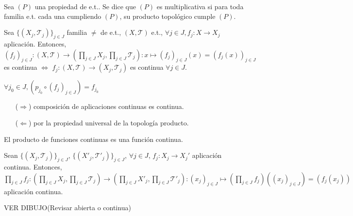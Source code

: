 \begin{defn}
  Sea $(P)$ una propiedad de e.t.. Se dice que $(P)$ es multiplicativa si para toda familia e.t. cada una cumpliendo $(P)$, su producto topológico cumple $(P)$.
\end{defn}

\begin{prop}
  Sea $\{ ( X_{j}, \mathcal{T}_{j} ) \}_{j \in J}$ familia $\neq$ de e.t., $( X, \mathcal{T} )$ e.t., $\forall j \in J, f_{j}: X \to X_{j}$ aplicación. Entonces, $( f_{j} )_{j \in J}: ( X, \mathcal{T} ) \to ( \prod_{j \in J} X_{j}, \prod_{j \in J} \mathcal{T}_{j} ) : x \mapsto ( f_{j} )_{j \in J}(x) = ( f_{j}(x) )_{j \in J}$ es continua $\Leftrightarrow$ $f_{j}: ( X, \mathcal{T} ) \to ( X_{j}, \mathcal{T}_{j} )$  es continua $\forall j \in J$.
\end{prop}

\begin{dem}
  $\forall j_{0} \in J, (p_{j_{0}} \circ ( f_{j} )_{j \in J}) = f_{j_{0}}$
  \begin{enumerate}[label=(\roman*)]
    \item [($\Rightarrow$)]  composición de aplicaciones continuas es continua.
    \item [($\Leftarrow$)] por la propiedad universal de la topología producto.
  \end{enumerate}
\end{dem}

 \begin{obs}
   El producto de funciones continuas es una función continua.
 \end{obs}

\begin{prop}
  Sean $\{ ( X_{j}, \mathcal{T}_{j} ) \}_{j \in J}$, $\{ ( X'_{j}, \mathcal{T'}_{j} ) \}_{j \in J}$, $\forall j \in J$, $f_{j}: X_{j} \to X_{j}'$ aplicación continua. Entonces, $\prod_{j \in J} f_{j}: ( \prod_{j \in J} X_{j}, \prod_{j \in J} \mathcal{T}_{j} ) \to ( \prod_{j \in J} X'_{j}, \prod_{j \in J} \mathcal{T'}_{j} ): ( x_{j} )_{j \in J} \mapsto (\prod_{j \in J} f_{j})(( x_{j} )_{j \in J}) = (f_{j}(x_{j}))$ aplicación continua.
\end{prop}

VER DIBUJO(Revisar abierta o continua)

